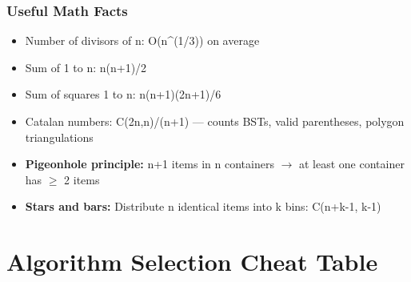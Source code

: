 \documentclass[11pt]{article}
\providecommand{\tightlist}{\setlength{\itemsep}{1pt}\setlength{\parskip}{0pt}}
\begin{document}
\subsubsection{Useful Math Facts}\label{useful-math-facts}

\begin{itemize}
\tightlist
\item
  Number of divisors of n: O(n\^{}(1/3)) on average
\item
  Sum of 1 to n: n(n+1)/2
\item
  Sum of squares 1 to n: n(n+1)(2n+1)/6
\item
  Catalan numbers: C(2n,n)/(n+1) --- counts BSTs, valid parentheses, polygon triangulations
\item
  \textbf{Pigeonhole principle:} n+1 items in n containers \(\rightarrow\) at least one container has \(\geq\) 2 items
\item
  \textbf{Stars and bars:} Distribute n identical items into k bins: C(n+k-1, k-1)
\end{itemize}

\section{Algorithm Selection Cheat Table}\label{algorithm-selection-cheat-table}
\end{document}
